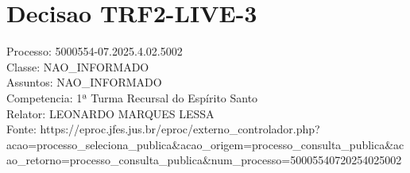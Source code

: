 \documentclass[12pt]{article}
\begin{document}
\section*{Decisao TRF2-LIVE-3}
Processo: 5000554-07.2025.4.02.5002\\
Classe: NAO\_INFORMADO\\
Assuntos: NAO\_INFORMADO\\
Competencia: 1ª Turma Recursal do Espírito Santo\\
Relator: LEONARDO MARQUES LESSA\\
Fonte: https://eproc.jfes.jus.br/eproc/externo\_controlador.php?acao=processo\_seleciona\_publica\&acao\_origem=processo\_consulta\_publica\&acao\_retorno=processo\_consulta\_publica\&num\_processo=50005540720254025002
\end{document}
